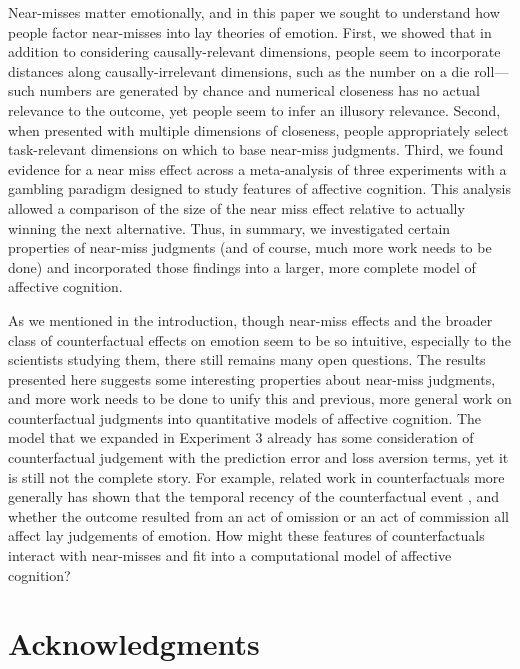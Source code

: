 \documentclass[10pt,letterpaper]{article}
\begin{document}
Near-misses matter emotionally, and in this paper we sought to understand how people factor near-misses into lay theories of emotion. First, we showed that in addition to considering causally-relevant dimensions, people seem to incorporate distances along causally-irrelevant dimensions, such as the number on a die roll---such numbers are generated by chance and numerical closeness has no actual relevance to the outcome, yet people seem to infer an illusory relevance. Second, when presented with multiple dimensions of closeness, people appropriately select task-relevant dimensions on which to base near-miss judgments. Third, we found evidence for a near miss effect across a meta-analysis of three experiments with a gambling paradigm designed to study features of affective cognition. This analysis allowed a comparison of the size of the near miss effect relative to actually winning the next alternative. Thus, in summary, we investigated certain properties of near-miss judgments (and of course, much more work needs to be done) and incorporated those findings into a larger, more complete model of affective cognition.


As we mentioned in the introduction, though near-miss effects and the broader class of counterfactual effects on emotion seem to be so intuitive, especially to the scientists studying them, there still remains many open questions. The results presented here suggests some interesting properties about near-miss judgments, and more work needs to be done to unify this and previous, more general work on counterfactual judgments into quantitative models of affective cognition. The model that we expanded in Experiment 3 already has some consideration of counterfactual judgement with the prediction error and loss aversion terms, yet it is still not the complete story. For example, related work in counterfactuals more generally has shown that the temporal recency of the counterfactual event \cite{Miller1990}, and whether the outcome resulted from an act of omission or an act of commission \cite{Kahneman1982, Landman1987} all affect lay judgements of emotion. How might these features of counterfactuals interact with near-misses and fit into a computational model of affective cognition?







\section{Acknowledgments}
\end{document}
